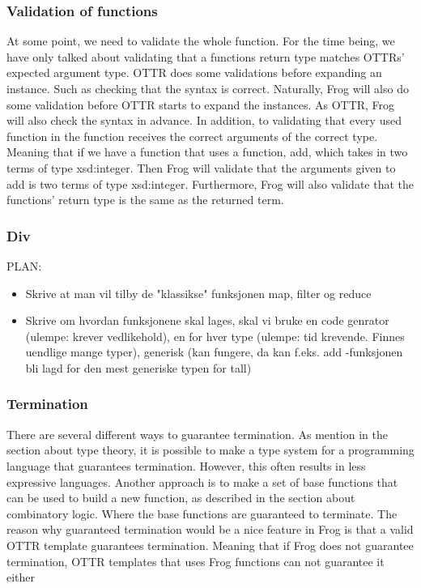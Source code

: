 \subsubsection{Validation of functions}
At some point, we need to validate the whole function. For the time being, we have only talked about validating that a functions return type matches OTTRs' expected argument type.  OTTR does some validations before expanding an instance. Such as checking that the syntax is correct. Naturally, Frog will also do some validation before OTTR starts to expand the instances. As OTTR, Frog will also check the syntax in advance. In addition, to validating that every used function in the function receives the correct arguments of the correct type. Meaning that if we have a function that uses a function, add, which takes in two terms of type xsd:integer. Then Frog will validate that the arguments given to add is two terms of type xsd:integer. Furthermore, Frog will also validate that the functions' return type is the same as the returned term.

\subsubsection{Div}
PLAN:
\begin{itemize}
    \item Skrive at man vil tilby de "klassikse" funksjonen map, filter og reduce
    \item Skrive om hvordan funksjonene skal lages, skal vi bruke en code genrator (ulempe: krever vedlikehold), en for hver type (ulempe: tid krevende. Finnes uendlige mange typer), generisk (kan fungere, da kan f.eks. add -funksjonen bli lagd for den mest generiske typen for tall)
\end{itemize}

\subsubsection{Termination}
There are several different ways to guarantee termination. As mention in the section about type theory, 
it is possible to make a type system for a programming language that guarantees termination. However, this often results in less expressive languages. 
Another approach is to make a set of base functions that can be used to build a new function, as described in the section about combinatory logic. 
Where the base functions are guaranteed to terminate. The reason why guaranteed termination would be a nice feature in Frog is that a valid OTTR template guarantees termination. 
Meaning that if Frog does not guarantee termination, OTTR templates that uses Frog functions can not guarantee it either

